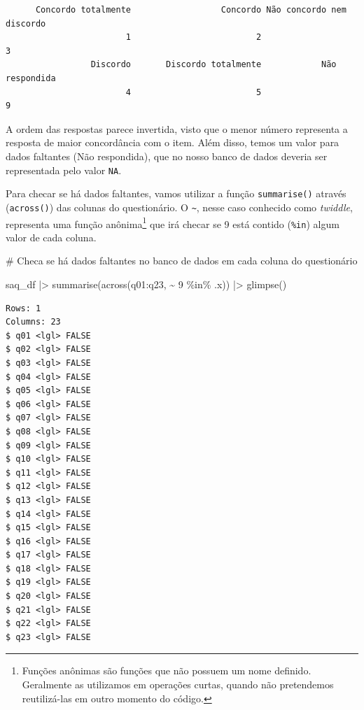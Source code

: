 \documentclass[
  letterpaper,
  DIV=11,
  numbers=noendperiod]{scrartcl}
\newenvironment{Shaded}{\begin{snugshade}}{\end{snugshade}}
\newcommand{\CommentTok}[1]{\textcolor[rgb]{0.37,0.37,0.37}{#1}}
\newcommand{\DecValTok}[1]{\textcolor[rgb]{0.68,0.00,0.00}{#1}}
\newcommand{\FunctionTok}[1]{\textcolor[rgb]{0.28,0.35,0.67}{#1}}
\newcommand{\NormalTok}[1]{\textcolor[rgb]{0.00,0.23,0.31}{#1}}
\newcommand{\SpecialCharTok}[1]{\textcolor[rgb]{0.37,0.37,0.37}{#1}}
\begin{document}
\begin{verbatim}
      Concordo totalmente                  Concordo Não concordo nem discordo 
                        1                         2                         3 
                 Discordo       Discordo totalmente            Não respondida 
                        4                         5                         9 
\end{verbatim}

A ordem das respostas parece invertida, visto que o menor número
representa a resposta de maior concordância com o item. Além disso,
temos um valor para dados faltantes (Não respondida), que no nosso banco
de dados deveria ser representada pelo valor \texttt{NA}.

Para checar se há dados faltantes, vamos utilizar a função
\texttt{summarise()} através (\texttt{across()}) das colunas do
questionário. O \texttt{\textasciitilde{}}, nesse caso conhecido como
\emph{twiddle}, representa uma função anônima\footnote{Funções anônimas
  são funções que não possuem um nome definido. Geralmente as utilizamos
  em operações curtas, quando não pretendemos reutilizá-las em outro
  momento do código.} que irá checar se 9 está contido (\texttt{\%in})
algum valor de cada coluna.

\begin{Shaded}
\begin{Highlighting}[]
\CommentTok{\# Checa se há dados faltantes no banco de dados em cada coluna do questionário}

\NormalTok{saq\_df }\SpecialCharTok{|\textgreater{}} 
  \FunctionTok{summarise}\NormalTok{(}\FunctionTok{across}\NormalTok{(q01}\SpecialCharTok{:}\NormalTok{q23, }\SpecialCharTok{\textasciitilde{}} \DecValTok{9} \SpecialCharTok{\%in\%}\NormalTok{ .x)) }\SpecialCharTok{|\textgreater{}} 
  \FunctionTok{glimpse}\NormalTok{()}
\end{Highlighting}
\end{Shaded}

\begin{verbatim}
Rows: 1
Columns: 23
$ q01 <lgl> FALSE
$ q02 <lgl> FALSE
$ q03 <lgl> FALSE
$ q04 <lgl> FALSE
$ q05 <lgl> FALSE
$ q06 <lgl> FALSE
$ q07 <lgl> FALSE
$ q08 <lgl> FALSE
$ q09 <lgl> FALSE
$ q10 <lgl> FALSE
$ q11 <lgl> FALSE
$ q12 <lgl> FALSE
$ q13 <lgl> FALSE
$ q14 <lgl> FALSE
$ q15 <lgl> FALSE
$ q16 <lgl> FALSE
$ q17 <lgl> FALSE
$ q18 <lgl> FALSE
$ q19 <lgl> FALSE
$ q20 <lgl> FALSE
$ q21 <lgl> FALSE
$ q22 <lgl> FALSE
$ q23 <lgl> FALSE
\end{verbatim}
\end{document}
